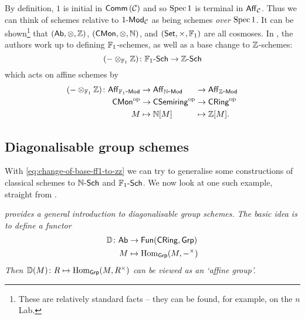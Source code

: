         \bigskip

        By definition, $1$ is initial in $\mathsf{Comm}\left({\mathcal{C}}\right)$ and so $\operatorname{Spec}1$ is terminal in $\mathsf{Aff}_{\mathcal{C}}$.
        Thus we can think of schemes relative to ${{1}\hbox{-}\mathsf{Mod}}_{\mathcal{C}}$ as being schemes \emph{over} $\operatorname{Spec}1$.
        It can be shown\footnote{
                These are relatively standard facts -- they can be found, for example, on the $n$Lab.
        } that $(\mathsf{Ab},\otimes,\mathbb{Z})$, $(\mathsf{CMon},\otimes,\mathbb{N})$, and $(\mathsf{Set},\times,\mathbb{F}_1)$ are all cosmoses.
        In \cite[\S3.1--3.3]{Toen:2005wxa}, the authors work up to defining $\mathbb{F}_1$-schemes, as well as a base change to $\mathbb{Z}$-schemes:
        \begin{equation}\label{eq:change-of-base-ff1-to-zz}
            ({-}\otimes_{\mathbb{F}_1}\mathbb{Z})\colon{\mathbb{F}_1}\hbox{-}\mathsf{Sch}\to{\mathbb{Z}}\hbox{-}\mathsf{Sch}
        \end{equation}
        which acts on affine schemes by
        \begin{equation}\label{eq:ff1-to-zz-affine}
            \begin{alignedat}{3}
                ({-}\otimes_{\mathbb{F}_1}\mathbb{Z})\colon\mathsf{Aff}_{{{\mathbb{F}_1}\hbox{-}\mathsf{Mod}}}&\to\mathsf{Aff}_{{{\mathbb{N}}\hbox{-}\mathsf{Mod}}}&&\to\mathsf{Aff}_{{{\mathbb{Z}}\hbox{-}\mathsf{Mod}}}\\
                {\mathsf{CMon}}^{\mathrm{op}}&\to{\mathsf{CSemiring}}^{\mathrm{op}}&&\to{\mathsf{CRing}}^{\mathrm{op}}\\
                M&\mapsto\mathbb{N}[M]&&\mapsto\mathbb{Z}[M].
            \end{alignedat}
        \end{equation}
    







    \subsection{Diagonalisable group schemes} %
    \label{sub:diagonalisable_group_schemes}

        With \cref{eq:change-of-base-ff1-to-zz} we can try to generalise some constructions of classical schemes to ${\mathbb{N}}\hbox{-}\mathsf{Sch}$ and ${\mathbb{F}_1}\hbox{-}\mathsf{Sch}$.
        We now look at one such example, straight from \cite[\S4]{Toen:2005wxa}.

        \bigskip

        \emph{\Cite[\S XIV.3,~p.217]{Milne:2012wc} provides a general introduction to diagonalisable group schemes.}
        \emph{The basic idea is to define a functor}
        \begin{align*}
            \mathbb{D}\colon\mathsf{Ab}&\to\mathsf{Fun}(\mathsf{CRing},\mathsf{Grp})\\
            M&\mapsto\operatorname{Hom}_{\mathsf{Grp}}(M,{-}^\times)
        \end{align*}
        \emph{Then $\mathbb{D}(M)\colon R\mapsto\operatorname{Hom}_{\mathsf{Grp}}(M,R^\times)$ can be viewed as an `affine group'.}

